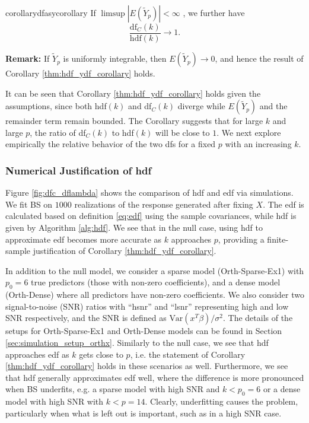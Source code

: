 \begin{restatable}{corollary}{dfasycorollary}
	\label{thm:hdf_ydf_corollary}
	If $\limsup |E(\tilde{Y}_p)| < \infty$ , we further have
	\begin{equation}
	\label{eq:main_corollary}
	\frac{\text{df}_C(k)}{\text{hdf}(k)} \rightarrow 1.
	\end{equation}
\end{restatable}
\noindent\textbf{Remark:} If $\tilde{Y}_p$ is uniformly integrable, then $E(\tilde{Y}_p) \rightarrow 0$, and hence the result of Corollary \ref{thm:hdf_ydf_corollary} holds.

It can be seen that Corollary \ref{thm:hdf_ydf_corollary} holds given the assumptions, since both hdf$(k)$ and df$_C(k)$ diverge while $E(\tilde{Y}_p)$ and the remainder term remain bounded. The Corollary suggests that for large $k$ and large $p$, the ratio of df$_C(k)$ to hdf$(k)$ will be close to $1$. We next explore empirically the relative behavior of the two dfs for a fixed $p$ with an increasing $k$. 

\subsubsection{Numerical Justification of hdf}
Figure \ref{fig:dfc_dflambda} shows the comparison of hdf and edf via simulations. We fit BS on $1000$ realizations of the response generated after fixing $X$. The edf is calculated based on definition \eqref{eq:edf} using the sample covariances, while hdf is given by Algorithm \ref{alg:hdf}. We see that in the null case, using hdf to approximate edf becomes more accurate as $k$ approaches $p$, providing a finite-sample justification of Corollary \ref{thm:hdf_ydf_corollary}. 

In addition to the null model, we consider a sparse model (Orth-Sparse-Ex1) with $p_0=6$ true predictors (those with non-zero coefficients), and a dense model (Orth-Dense) where all predictors have non-zero coefficients. We also consider two signal-to-noise (SNR) ratios with ``hsnr'' and ``lsnr'' representing high and low SNR respectively, and the SNR is defined as $\text{Var}(x^T \beta)/\sigma^2$. The details of the setups for Orth-Sparse-Ex1 and Orth-Dense models can be found in Section \ref{sec:simulation_setup_orthx}. Similarly to the null case, we see that hdf approaches edf as $k$ gets close to $p$, i.e. the statement of Corollary \ref{thm:hdf_ydf_corollary} holds in these scenarios as well. Furthermore, we see that hdf generally approximates edf well, where the difference is more pronounced when BS underfits, e.g. a sparse model with high SNR and $k<p_0=6$ or a dense model with high SNR with $k<p=14$. Clearly, underfitting causes the problem, particularly when what is left out is important, such as in a high SNR case.   


